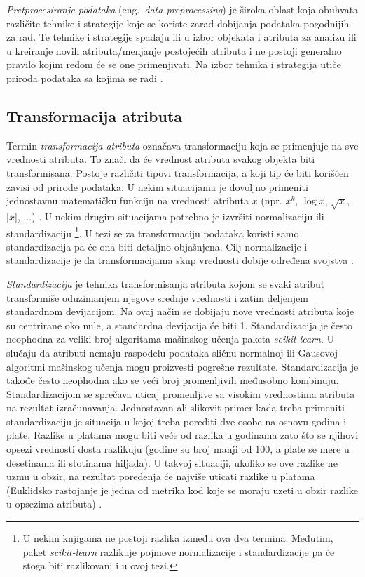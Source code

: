 \documentclass[12pt,oneside]{memoir}
\begin{document}
\textit{Pretprocesiranje podataka} (eng.~\textit{data preprocessing}) je široka oblast koja obuhvata različite tehnike i strategije koje se koriste zarad dobijanja podataka pogodnijih za rad. Te tehnike i strategije spadaju ili u izbor objekata i atributa za analizu ili u kreiranje novih atributa/menjanje postojećih atributa i ne postoji generalno pravilo kojim redom će se one primenjivati. Na izbor tehnika i strategija utiče priroda podataka sa kojima se radi \cite{mitic}. 

\subsection{Transformacija atributa}

Termin \textit{transformacija atributa} označava transformaciju koja se primenjuje na sve vrednosti atributa. To znači da će vrednost atributa svakog objekta biti transformisana. Postoje različiti tipovi transformacija, a koji tip će biti korišćen zavisi od prirode podataka. U nekim situacijama je dovoljno primeniti jednostavnu matematičku funkciju na vrednosti atributa $x$ (npr. $x^k$, $\log x$, $\sqrt{x}$, $\left| x \right|$, ...) . U nekim drugim situacijama potrebno je izvršiti normalizaciju ili standardizaciju \footnote{U nekim knjigama ne postoji razlika između ova dva termina. Međutim, paket \textit{scikit-learn} razlikuje pojmove normalizacije i standardizacije pa će stoga biti razlikovani i u ovoj tezi.}. U tezi se za transformaciju podataka koristi samo standardizacija pa će ona biti detaljno objašnjena. Cilj normalizacije i standardizacije je da transformacijama skup vrednosti dobije određena svojstva \cite{mitic}.  

\textit{Standardizacija} je tehnika transformisanja atributa kojom se svaki atribut transformiše oduzimanjem njegove srednje vrednosti i zatim deljenjem standardnom devijacijom. Na ovaj način se dobijaju nove vrednosti atributa koje su centrirane oko nule, a standardna devijacija će biti 1. Standardizacija je često neophodna za veliki broj algoritama mašinskog učenja paketa \textit{scikit-learn}. U slučaju da atributi nemaju raspodelu podataka sličnu normalnoj ili Gausovoj algoritmi mašinskog učenja mogu proizvesti pogrešne rezultate. Standardizacija je takođe često neophodna ako se veći broj promenljivih međusobno kombinuju. Standardizacijom se sprečava uticaj promenljive sa visokim vrednostima atributa na rezultat izračunavanja. Jednostavan ali slikovit primer kada treba primeniti standardizaciju je situacija u kojoj treba porediti dve osobe na osnovu godina i plate. Razlike u platama mogu biti veće od razlika u godinama zato što se njihovi opsezi vrednosti dosta razlikuju (godine su broj manji od 100, a plate se mere u desetinama ili stotinama hiljada). U takvoj situaciji, ukoliko se ove razlike ne uzmu u obzir, na rezultat poređenja će najviše uticati razlike u platama (Euklidsko rastojanje je jedna od metrika kod koje se moraju uzeti u obzir razlike u opsezima atributa) \cite{ sklearn_preprocessing, mlm2, mitic}. 
\end{document}
